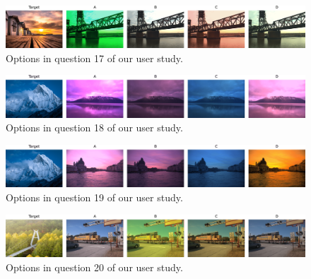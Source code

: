 \begin{figure}[ht]
    \centering
    \includegraphics[width=1\linewidth]{figures/user_study/question_17.png}
    \caption{Options in question 17 of our user study.}
    \label{fig:appendix-user-study-q17}
\end{figure}



\begin{figure}[h]
    \centering
    \includegraphics[width=1\linewidth]{figures/user_study/question_18.png}
    \caption{Options in question 18 of our user study.}
    \label{fig:appendix-user-study-q18}
\end{figure}



\begin{figure}[ht]
    \centering
    \includegraphics[width=1\linewidth]{figures/user_study/question_19.png}
    \caption{Options in question 19 of our user study.}
    \label{fig:appendix-user-study-q19}
\end{figure}



\begin{figure}[ht]
    \centering
    \includegraphics[width=1\linewidth]{figures/user_study/question_20.png}
    \caption{Options in question 20 of our user study.}
    \label{fig:appendix-user-study-q20}
\end{figure}


